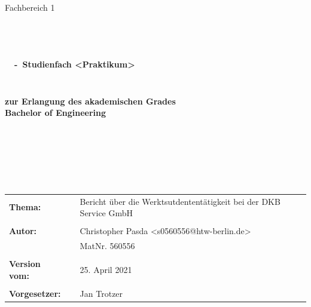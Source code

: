 \begin{center}
\Large{Fachbereich 1}
\end{center}
\begin{verbatim}

\end{verbatim}
\begin{center}
\doublespacing
\textbf{\LARGE{\titleDocument}}\\
\singlespacing
\begin{verbatim}

\end{verbatim}
\textbf{{~\subjectDocument~-~Studienfach <Praktikum>}}
\end{center}
\begin{verbatim}

\end{verbatim}
\begin{center}

\end{center}
\begin{verbatim}

\end{verbatim}
\begin{center}
\textbf{zur Erlangung des akademischen Grades \\ Bachelor of Engineering}
\end{center}
\begin{verbatim}






\end{verbatim}
\begin{flushleft}
\begin{tabular}{llll}
\textbf{Thema:} & & Bericht über die Werktsutdententätigkeit bei der DKB Service GmbH & \\
& & \\
\textbf{Autor:} & & Christopher Pasda <s0560556@htw-berlin.de>& \\
& & MatNr. 560556 & \\
& & \\
\textbf{Version vom:} & & 25. April 2021&\\
& & \\
\textbf{Vorgesetzer:} & & Jan Trotzer &\\

\end{tabular}
\end{flushleft}
